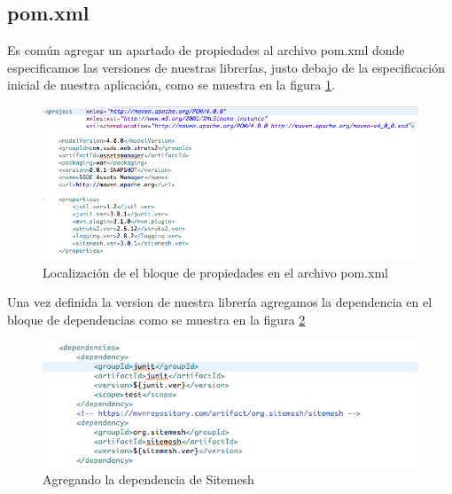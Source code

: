 \documentclass[12pt]{article}
\begin{document}
		\subsection{pom.xml}
		Es com\'un agregar un apartado de propiedades al archivo pom.xml donde especificamos las versiones de nuestras librer\'ias, justo debajo de la especificaci\'on inicial de nuestra aplicaci\'on, como se muestra en la figura \ref{05_pom_xml}.
        \begin{figure}[h]
            \centering
            \includegraphics[scale=0.4]{05_pom_xml}
            \caption{Localizaci\'on de el bloque de propiedades en el archivo pom.xml}
            \label{05_pom_xml}
        \end{figure}
        
        Una vez definida la version de nuestra librer\'ia agregamos la dependencia en el bloque de dependencias como se muestra en la figura \ref{06_pom_xml}
        \begin{figure}[h]
            \centering
            \includegraphics[scale=0.4]{06_pom_xml}
            \caption{Agregando la dependencia de Sitemesh}
            \label{06_pom_xml}
        \end{figure}
        \newpage
        
\end{document}
